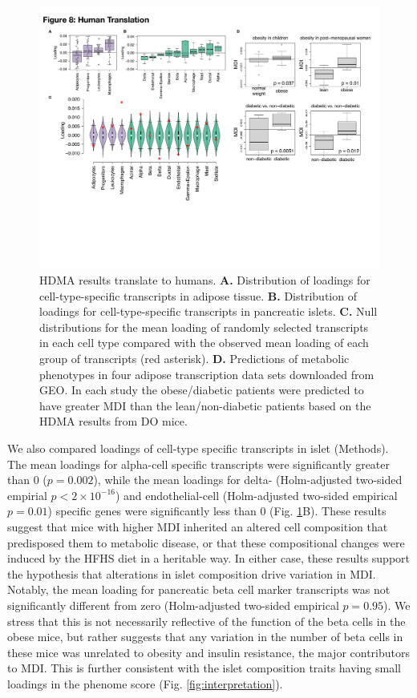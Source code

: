 \documentclass[
]{article}
\begin{document}
\begin{figure}[ht!]
\includegraphics[width=\textwidth]{Figures/Fig8_Human_Translation.pdf} 
\caption{HDMA results translate to humans. \textbf{A.} Distribution of 
loadings for cell-type-specific transcripts in adipose tissue. \textbf{B.} 
Distribution of loadings for cell-type-specific transcripts in pancreatic 
islets. \textbf{C.} Null distributions for the mean loading of 
randomly selected transcripts in each cell type compared with the observed 
mean loading of each group of transcripts (red asterisk). \textbf{D.} 
Predictions of metabolic phenotypes in four adipose transcription data 
sets downloaded from GEO. In each study the obese/diabetic patients were 
predicted to have greater MDI than the lean/non-diabetic 
patients based on the HDMA results from DO mice.
}
\label{fig:human_translation}
\end{figure}

We also compared loadings of cell-type specific transcripts in islet
(Methods). The mean loadings for alpha-cell specific transcripts were
significantly greater than 0 (\(p = 0.002\)), while the mean loadings
for delta- (Holm-adjusted two-sided empirial \(p < 2\times10^{-16}\))
and endothelial-cell (Holm-adjusted two-sided empirical \(p = 0.01\))
specific genes were significantly less than 0 (Fig.
\ref{fig:human_translation}B). These results suggest that mice with
higher MDI inherited an altered cell composition that predisposed them
to metabolic disease, or that these compositional changes were induced
by the HFHS diet in a heritable way. In either case, these results
support the hypothesis that alterations in islet composition drive
variation in MDI. Notably, the mean loading for pancreatic beta cell
marker transcripts was not significantly different from zero
(Holm-adjusted two-sided empirical \(p = 0.95\)). We stress that this is
not necessarily reflective of the function of the beta cells in the
obese mice, but rather suggests that any variation in the number of beta
cells in these mice was unrelated to obesity and insulin resistance, the
major contributors to MDI. This is further consistent with the islet
composition traits having small loadings in the phenome score (Fig.
\ref{fig:interpretation}).
\end{document}
